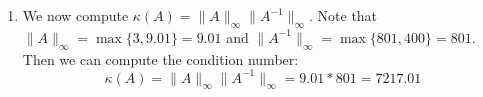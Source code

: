 \documentclass[11pt]{article}
\begin{document}
\begin{exercise}{2}
{\begin{enumerate}[label=\alph*)]
$$            \dfrac{\| \begin{pmatrix} -2 \\ 1 \end{pmatrix} \| }{\| \begin{pmatrix} 1 \\ 1 \end{pmatrix} \|} =
            \dfrac{2}{1} = 2
            $$ \\
            $$
            e_b = \dfrac{\| b - \bhat \|}{\| b \|} =
            \dfrac{\| \begin{pmatrix} 3 \\ 9.01 \end{pmatrix} - \begin{pmatrix} 3 \\ 9 \end{pmatrix} \| }{\| \begin{pmatrix} 3 \\ 9.01 \end{pmatrix} \|} =
            \dfrac{\| \begin{pmatrix} 0 \\ 0.01 \end{pmatrix} \| }{\| \begin{pmatrix} 3 \\ 9.01 \end{pmatrix} \|} =
            \dfrac{0.01}{9.01} = \dfrac{1}{901}
            $$
            The relative errors differ by a large amount.
            The relative error in our input variable is $e_b = 1/901 \approx 0.11\% $ which is rather small.
            However, our relative output error is $e_x = 2 = 200\% $, which is much larger than our input error.
            This suggests that our system is highly sensitive to small changes in initial conditions.
            \item We now compute $\kappa (A) = \| A \| _\infty \| A^{-1} \| _\infty$.
            Note that $ \| A \| _\infty = \max \{ 3, 9.01 \} = 9.01 $ and $\| A^{-1} \| _\infty = \max \{ 801, 400 \} = 801 $.
            Then we can compute the condition number:
            $$ \kappa (A) = \| A \| _\infty \| A^{-1} \| _\infty = 9.01 * 801 = 7217.01 $$
        \end{enumerate}
    }
\end{exercise}

\end{document}
